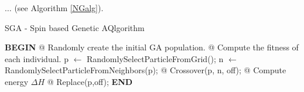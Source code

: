 \documentclass[runningheads,a4paper,11pt]{report}
\begin{document}
$\ldots$ (see Algorithm \ref{NGalg}).



\begin{algorithm}
	\caption{SGA - Spin based Genetic AQlgorithm}
	\label{NGalg}
		\begin{algorithmic}


			\STATE \textbf{BEGIN}
  		\STATE @ Randomly create the initial GA population.
  		\STATE @ Compute the fitness of each individual.
  				\STATE p $\leftarrow$ RandomlySelectParticleFromGrid();
  				\STATE n $\leftarrow$ RandomlySelectParticleFromNeighbors(p);
  				\STATE @ Crossover(p, n, off);
  				\STATE @ Compute energy $\Delta H$
  					\STATE @ Replace(p,off);
  				\ENDIF
  			\ENDFOR
  		\ENDFOR
  		\STATE \textbf{END}
\end{algorithmic}
\end{algorithm}




\end{document}

